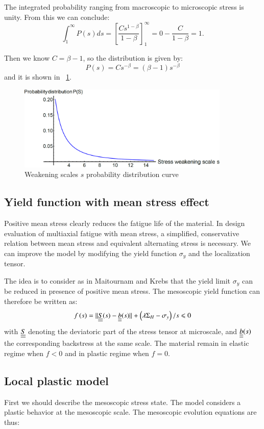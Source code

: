 \documentclass[3p,times,number,review]{elsarticle}
\newcommand{\figref}[1]{\figurename~\ref{#1}}
\begin{document}
The integrated probability ranging from macroscopic to microscopic stress  is unity. From this we can conclude:
$$\int_{1}^{\infty}P(s)ds=\left[ \frac{Cs^{1-\beta}}{1-\beta}\right] _{1}^{\infty}=0-\frac{C}{1-\beta}=1.$$


Then we know $C=\beta-1$, so the distribution is given by:
$$P(s) = Cs^{-\beta}=(\beta-1)s^{-\beta}$$ and it is shown in \figref{ps}.
\begin{figure}[!h]
	\centering
	\includegraphics[width=0.9\textwidth]{figures//ps.png} 
	\caption{Weakening scales $s$ probability distribution curve}
	\label{ps}
\end{figure}


\subsection{Yield function with mean stress effect}

Positive mean stress clearly reduces the fatigue life of the material. In design evaluation of multiaxial fatigue with mean stress, a simplified, conservative relation between mean stress and equivalent alternating stress is necessary. We can improve the model by modifying the yield function $\sigma_y$ and the localization tensor.

The idea is to consider as in Maitournam and Krebs\cite{Maitournam2011232} that the yield limit $\sigma_y$ can be reduced in presence of positive mean stress. The mesoscopic yield function can therefore be written as:
\begin{equation}
f\left(s\right)=||\uline{\uline{S}}(s)-\uline{\uline{b}}(s)||+\left( \lambda \Sigma_H-\sigma_y\right) /s\leqslant 0
\label{yieldfun}
\end{equation}
with $\uline{\uline{S}}$ denoting the deviatoric part of the stress tensor at microscale, and $\uline{\uline{b}}(s)$ the corresponding backstress at the same scale. The material remain in elastic regime when $f<0$ and in plastic regime when $f=0$.

\subsection{Local plastic model}
First we should describe the mesoscopic stress state.  The model considers a plastic 
behavior at the mesoscopic scale. The mesoscopic evolution equations are thus:
\end{document}
